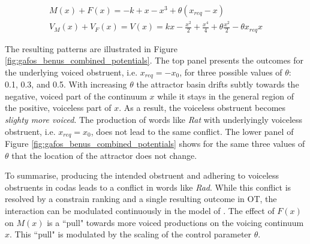 \begin{equation}
\begin{split}
M(x) + F(x) = -k+x-x^3 + \theta (x_{req} - x) \\
V_M(x) + V_F(x) = V(x) = kx - \frac{x^2}{2} + \frac{x^4}{4} + \theta \frac{x^2}{2} - \theta x_{req} x
\end{split}
\label{eq:gafos_benus_interaction}
\end{equation}

The resulting patterns are illustrated in Figure \ref{fig:gafos_benus_combined_potentials}. The top panel presents the outcomes for the underlying voiced obstruent, i.e. $x_{req} = -x_0$, for three possible values of $\theta$: 0.1, 0.3, and 0.5. With increasing $\theta$ the attractor basin drifts subtly towards the negative, voiced part of the continuum $x$ while it stays in the general region of the positive, voiceless part of $x$. As a result, the voiceless obstruent becomes \emph{slighty more voiced}. The production of words like \emph{Rat} with underlyingly voiceless obstruent, i.e. $x_{req} = x_0$, does not lead to the same conflict. The lower panel of Figure \ref{fig:gafos_benus_combined_potentials} shows for the same three values of $\theta$ that the location of the attractor does not change. 

To summarise, producing the intended obstruent and adhering to voiceless obstruents in codas leads to a conflict in words like \emph{Rad}. While this conflict is resolved by a constrain ranking and a single resulting outcome in OT, the interaction can be modulated continuously in the model of \citet{GafosBenus2006}. The effect of $F(x)$ on $M(x)$ is a ``pull" towards more voiced productions on the voicing continuum $x$. This ``pull" is modulated by the scaling of the control parameter $\theta$. 

